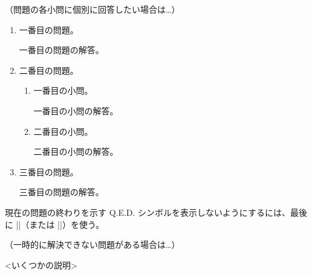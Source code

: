 \documentclass[11pt,
  logo = {example-image},
  title in boldface,
  theorem in new line,
  colored solution,
]{homework}
\begin{document}
\bigskip\textcolor{gray!55}{（問題の各小問に個別に回答したい場合は…）}

\begin{problem}[多くの小問がある問題]
    \begin{enumerate}[itemsep=.5\baselineskip]
        \item 一番目の問題。

        \begin{solution}
            一番目の問題の解答。
        \end{solution}

        \item 二番目の問題。

        \begin{enumerate}[itemsep=.3\baselineskip]
            \item 一番目の小問。

            \begin{solution}
                一番目の小問の解答。
            \end{solution}

            \item 二番目の小問。

            \begin{solution}
                二番目の小問の解答。
            \end{solution}

        \end{enumerate}

        \item 三番目の問題。

        \begin{solution}
            三番目の問題の解答。
        \end{solution}

    \end{enumerate}
    現在の問題の終わりを示す Q.E.D. シンボルを表示しないようにするには、最後に \cverb|\noqed|（または \cverb|\noQED|）を使う。
    \noQED
\end{problem}


\bigskip\textcolor{gray!55}{（一時的に解決できない問題がある場合は…）}

\DNF<いくつかの説明>
\end{document}
